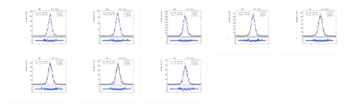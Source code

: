 \begin{figure}[htb]
\includegraphics[width=0.19\textwidth]{plots/Appendix_Recoil_Fits/ZmmData_PF_13TeV_2G_bkg/pfu1fit_16.pdf}
\includegraphics[width=0.19\textwidth]{plots/Appendix_Recoil_Fits/ZmmData_PF_13TeV_2G_bkg/pfu1fit_17.pdf}
\includegraphics[width=0.19\textwidth]{plots/Appendix_Recoil_Fits/ZmmData_PF_13TeV_2G_bkg/pfu1fit_18.pdf}
\includegraphics[width=0.19\textwidth]{plots/Appendix_Recoil_Fits/ZmmData_PF_13TeV_2G_bkg/pfu1fit_19.pdf}
\includegraphics[width=0.19\textwidth]{plots/Appendix_Recoil_Fits/ZmmData_PF_13TeV_2G_bkg/pfu1fit_20.pdf}
\includegraphics[width=0.19\textwidth]{plots/Appendix_Recoil_Fits/ZmmData_PF_13TeV_2G_bkg/pfu1fit_21.pdf}
\includegraphics[width=0.19\textwidth]{plots/Appendix_Recoil_Fits/ZmmData_PF_13TeV_2G_bkg/pfu1fit_22.pdf}
\includegraphics[width=0.19\textwidth]{plots/Appendix_Recoil_Fits/ZmmData_PF_13TeV_2G_bkg/pfu1fit_23.pdf}

\end{figure}
